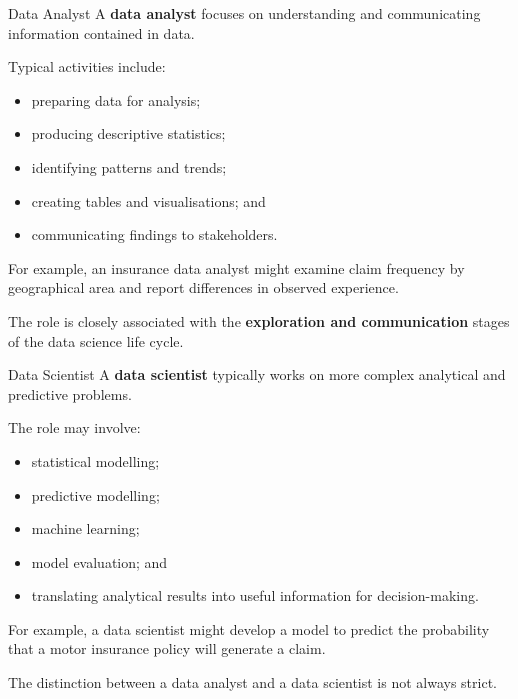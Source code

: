 \documentclass[
  ignorenonframetext,
  aspectratio=169,
]{beamer}
\providecommand{\tightlist}{%
  \setlength{\itemsep}{0pt}\setlength{\parskip}{0pt}}
\begin{document}
\begin{frame}{Data Analyst}
\protect{}\label{data-analyst}
A \textbf{data analyst} focuses on understanding and communicating
information contained in data.

Typical activities include:

\begin{itemize}
\tightlist
\item
  preparing data for analysis;
\item
  producing descriptive statistics;
\item
  identifying patterns and trends;
\item
  creating tables and visualisations; and
\item
  communicating findings to stakeholders.
\end{itemize}

For example, an insurance data analyst might examine claim frequency by
geographical area and report differences in observed experience.

The role is closely associated with the \textbf{exploration and
communication} stages of the data science life cycle.
\end{frame}

\begin{frame}{Data Scientist}
\protect{}\label{data-scientist}
A \textbf{data scientist} typically works on more complex analytical and
predictive problems.

The role may involve:

\begin{itemize}
\tightlist
\item
  statistical modelling;
\item
  predictive modelling;
\item
  machine learning;
\item
  model evaluation; and
\item
  translating analytical results into useful information for
  decision-making.
\end{itemize}

For example, a data scientist might develop a model to predict the
probability that a motor insurance policy will generate a claim.

The distinction between a data analyst and a data scientist is not
always strict.
\end{frame}
\end{document}
